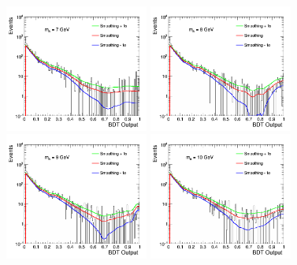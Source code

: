 \begin{figure}[htbp]
  \begin{center}
		\includegraphics[width=0.42\textwidth]{figures/chapter04/bkg_smooth/M7_all_DYJetsToLL_SR.png}
        \includegraphics[width=0.42\textwidth]{figures/chapter04/bkg_smooth/M8_all_DYJetsToLL_SR.png} \\
		\includegraphics[width=0.42\textwidth]{figures/chapter04/bkg_smooth/M9_all_DYJetsToLL_SR.png}
		\includegraphics[width=0.42\textwidth]{figures/chapter04/bkg_smooth/M10_all_DYJetsToLL_SR.png}\\

\end{center}
\end{figure}
